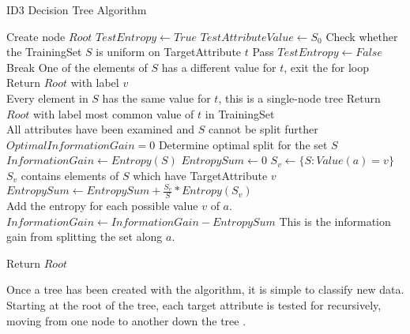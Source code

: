 \begin{algorithm}
  \caption{ID3 Decision Tree Algorithm}
  \begin{algorithmic}
    \State Create node $Root$
    \State $TestEntropy\gets True$
    \State $TestAttributeValue\gets S_0$
    \Comment Check whether the TrainingSet $S$ is uniform on TargetAttribute $t$
    \State Pass
    \Else
    \State $TestEntropy\gets False$
    \State Break
    \Comment One of the elements of $S$ has a different value for $t$, exit the for loop
    \EndIf
    \EndFor
    \State Return $Root$ with label $v$\\
    \Comment Every element in $S$ has the same value for $t$, this is a single-node tree
    \State Return $Root$ with label most common value of $t$ in TrainingSet\\
    \Comment All attributes have been examined and $S$ cannot be split further
    \Else
    \State $OptimalInformationGain=0$
    \Comment Determine optimal split for the set $S$
    \State $InformationGain \gets Entropy(S)$
    \State $EntropySum\gets 0$
    \State $S_v \gets \{S:Value(a)=v\}$
    \Comment $S_v$ contains elements of $S$ which have TargetAttribute $v$
    \State $EntropySum\gets EntropySum + \frac{S_v}{S} * Entropy(S_v)$\\
    \Comment Add the entropy for each possible value $v$ of $a$.
    \EndFor
    \State $InformationGain \gets InformationGain - EntropySum$
    \Comment This is the information gain from splitting the set along $a$.
    
    \EndIf
    \EndFor
    \EndIf
    \State Return $Root$
    \EndProcedure
  \end{algorithmic}
\end{algorithm}

Once a tree has been created with the algorithm, it is simple to classify new data. Starting at the root of the tree, each target attribute is tested for recursively, moving from one node to another down the tree \cite{sega07}.\\

